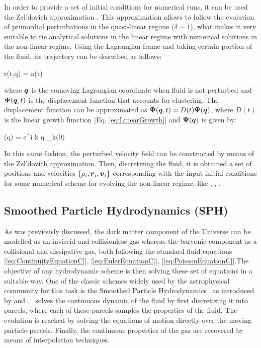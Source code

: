 \documentclass[a4,useAMS,usenatbib,usegraphicx,12pt]{article}
\begin{document}
In order to provide a set of initial conditions for numerical runs, it can be 
used the Zel'dovich approximation \citep{Zeldovich70}. This approximation allows
to follow the evolution of primordial perturbations in the quasi-linear regime 
($\delta \sim 1$), what makes it very suitable to tie analytical solutions in 
the linear regime with numerical solutions in the non-linear regime. Using the
Lagrangian frame and taking certain portion of the fluid, its trajectory can 
be described as follows:

{ \bds r(t,\bds q) = a(t) }

where $\boldsymbol{ q }$ is the comoving Lagrangian coordinate when fluid is not 
perturbed and $\boldsymbol{ \Psi }(\boldsymbol{ q }, t)$ is the displacement function that 
accounts for clustering. The displacement function can be approximated as 
$\boldsymbol{ \Psi }(\boldsymbol{ q }, t) = D(t)\boldsymbol{ \Psi }(\boldsymbol{ q })$, where $D(t)$ is the linear 
growth function [Eq. \ref{eq:LinearGrowth}] and $\boldsymbol{ \Psi }(\boldsymbol{ q })$ is given 
by:

{ \bds{\Psi}(\bds q) = \int {}e^{i \bds k \cdot \bds q}
\delta_{\bds k}(0) }

In this same fashion, the perturbed velocity field can be constructed by means
of the Zel'dovich approximation. Then, discretizing the fluid, it is obtained a 
set of positions and velocities $\{\rho_i,\boldsymbol{ r }_i, \boldsymbol{ v }_i\}$ corresponding 
with the input initial conditions for some numerical scheme for evolving the 
non-linear regime, like \SPH, \VPH, \AMR.


\subsection*{Smoothed Particle Hydrodynamics (SPH)}
As was previously discussed, the dark matter component of the Universe can be 
modelled as an inviscid and collisionless gas whereas the baryonic component as 
a collisional and dissipative gas, both following the standard fluid equations 
[\ref{eq:ContinuityEquationC}], [\ref{eq:EulerEquationC}], 
[\ref{eq:PoissonEquationC}].The objective of any hydrodynamic scheme is then 
solving these set of equations in a suitable way. One of the classic schemes 
widely used by the astrophysical community for this task is the Smoothed 
Particle Hydrodynamics \SPH\ as introduced by \citet{Lucy77} and 
\citet{Gingold77}. \SPH\ solves the continuous dynamic of the fluid by first
discretizing it into parcels, where each of these parcels samples the properties 
of the fluid. The evolution is reached by solving the equations of motion
directly over the moving particle-parcels. Finally, the continuous properties 
of the gas are recovered by means of interpolation techniques.
\end{document}
